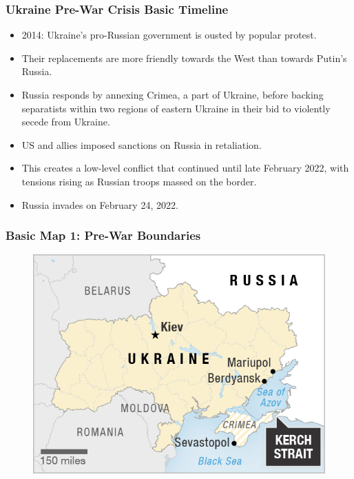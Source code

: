 \documentclass[handout]{beamer}
\begin{document}
\begin{frame} 
	\frametitle{\LARGE{Ukraine Pre-War Crisis Basic Timeline}}
	\begin{itemize}
		\item 2014: Ukraine's pro-Russian government is ousted by popular protest. \pause
		\item Their replacements are more friendly towards the West than towards Putin's Russia. \pause
		\item Russia responds by annexing Crimea, a part of Ukraine, before backing separatists within two regions of eastern Ukraine in their bid to violently secede from Ukraine. \pause
		\item US and allies imposed sanctions on Russia in retaliation.
		\item This creates a low-level conflict that continued until late February 2022, with tensions rising as Russian troops massed on the border.	
		\item Russia invades on February 24, 2022.
	\end{itemize}
\end{frame}

\begin{frame} 
	\frametitle{\LARGE{Basic Map 1: Pre-War Boundaries}}
	\begin{figure}[ht!]
		\centering
		\includegraphics[width=\textwidth,height=0.9\textheight,keepaspectratio]{map1.png}
	\end{figure}
\end{frame}
\end{document}
